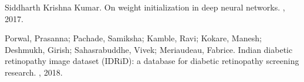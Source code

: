 \documentclass{article}
\begin{document}
  

\begin{thebibliography}{1}

  Siddharth Krishna Kumar.
  \newblock On weight initialization in deep neural networks.
  , 2017.

  Porwal, Prasanna; Pachade, Samiksha; Kamble, Ravi; Kokare, Manesh; Deshmukh, Girish; Sahasrabuddhe, Vivek; Meriaudeau, Fabrice.
  \newblock Indian diabetic retinopathy image dataset (IDRiD): a database for diabetic retinopathy screening research.
  , 2018.
  
  

  
  
  
  \end{thebibliography}
  
\end{document}
